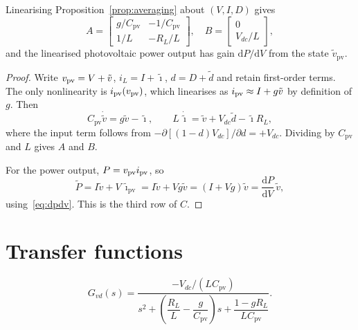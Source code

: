 \begin{proposition}
\label{prop:linearise}
Linearising Proposition~\ref{prop:averaging} about $(V, I, D)$ gives
\[
A = \begin{bmatrix} g/C_{\mathrm{pv}} & -1/C_{\mathrm{pv}} \\ 1/L & -R_L/L \end{bmatrix},
\quad
B = \begin{bmatrix} 0 \\ V_{dc}/L \end{bmatrix},
\]
and the linearised photovoltaic power output has gain $\mathrm{d}P/\mathrm{d}V$
from the state $\tilde v_{\mathrm{pv}}$.
\end{proposition}

\begin{proof}
Write $v_{\mathrm{pv}} = V + \tilde v$, $i_L = I + \tilde\imath$, $d = D + \tilde d$ and
retain first-order terms. The only nonlinearity is $i_{\mathrm{pv}}(v_{\mathrm{pv}})$, which
linearises as $i_{\mathrm{pv}} \approx I + g\tilde v$ by definition of $g$. Then
\[
C_{\mathrm{pv}}\dot{\tilde v} = g\tilde v - \tilde\imath,
\qquad
L\,\dot{\tilde\imath} = \tilde v + V_{dc}\tilde d - \tilde\imath R_L ,
\]
where the input term follows from
$-\partial\!\left[(1-d)V_{dc}\right]/\partial d = +V_{dc}$. Dividing by
$C_{\mathrm{pv}}$ and $L$ gives $A$ and $B$.

For the power output, $P = v_{\mathrm{pv}} i_{\mathrm{pv}}$, so
\[
\tilde P = I\tilde v + V\,\tilde\imath_{\mathrm{pv}} = I\tilde v + V g \tilde v
= \left(I + Vg\right)\tilde v = \frac{\mathrm{d}P}{\mathrm{d}V}\,\tilde v ,
\]
using~\eqref{eq:dpdv}. This is the third row of $C$.
\end{proof}

\section{Transfer functions}

\begin{proposition}
\label{prop:Gvd}
\[
G_{vd}(s) = \frac{-V_{dc}/(L C_{\mathrm{pv}})}
{s^2 + \left(\dfrac{R_L}{L} - \dfrac{g}{C_{\mathrm{pv}}}\right)s + \dfrac{1 - g R_L}{L C_{\mathrm{pv}}}} .
\]
\end{proposition}

